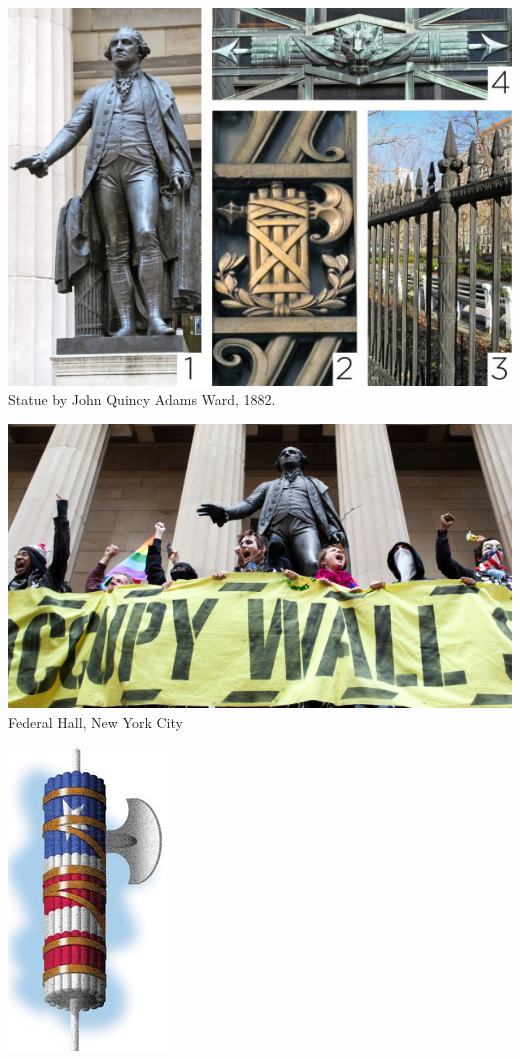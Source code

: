 \begin{frame}
    \centering
    \includegraphics[width=.9\textwidth]{img/fasces/fasces-stuff.jpg} \\
    Statue by John Quincy Adams Ward, 1882.
\end{frame}
\begin{frame}
    \centering
    \includegraphics[width=.9\textwidth]{img/fasces/ows.jpg} \\
    Federal Hall, New York City \\
\end{frame}
\begin{frame}
    \centering
    \includegraphics[height=.8\textheight]{img/fasces/flag-fasces.jpg} \\
\end{frame}
